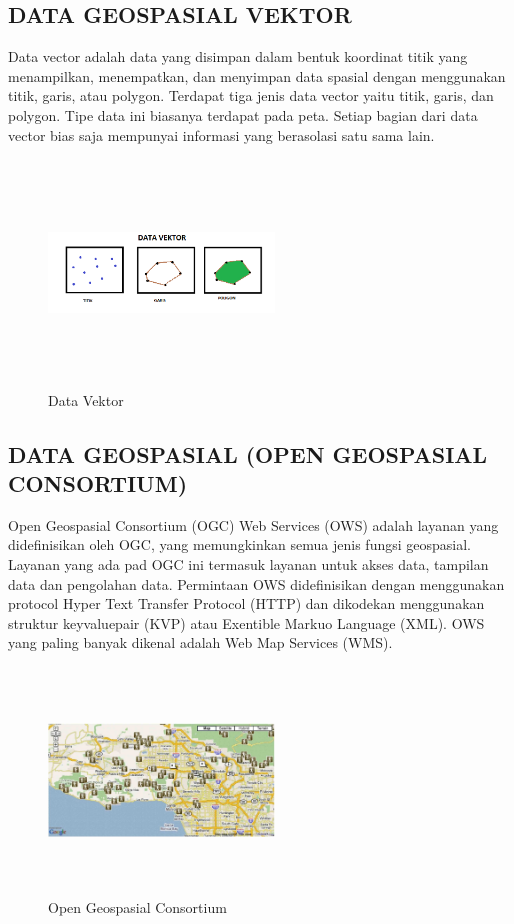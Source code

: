 \subsection{DATA GEOSPASIAL VEKTOR}
Data vector adalah data yang disimpan dalam bentuk koordinat titik yang menampilkan, menempatkan, dan menyimpan data spasial dengan menggunakan titik, garis, atau polygon. Terdapat tiga jenis data vector yaitu titik, garis, dan polygon. Tipe data ini biasanya terdapat pada peta. Setiap bagian dari data vector bias saja mempunyai informasi yang berasolasi satu sama lain.
\begin{figure}[!htbp]
\centering
\includegraphics[width=6cm,height=6cm]{figures/Tugas1/1174071/Vektor.PNG}
\caption{Data Vektor}
\end{figure}	
\subsection {DATA GEOSPASIAL (OPEN GEOSPASIAL CONSORTIUM)}
Open Geospasial Consortium (OGC) Web Services (OWS) adalah layanan yang didefinisikan oleh OGC, yang memungkinkan semua jenis fungsi geospasial. Layanan yang ada pad OGC ini termasuk layanan untuk akses data, tampilan data dan pengolahan data. Permintaan OWS didefinisikan dengan menggunakan protocol Hyper Text Transfer Protocol (HTTP) dan dikodekan menggunakan struktur keyvaluepair (KVP) atau Exentible Markuo Language (XML). OWS yang paling banyak dikenal adalah Web Map Services (WMS).
\begin{figure}[!htbp]
\centering
\includegraphics[width=6cm,height=6cm]{figures/Tugas1/1174071/OGC.jpg}
\caption{Open Geospasial Consortium}
\end{figure}
